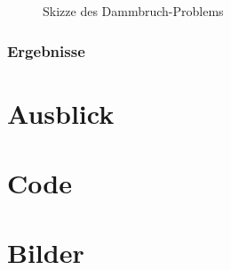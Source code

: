 \def\svgwidth{0.6\textwidth}
\begin{figure}[ht]
\centering
  \caption{Skizze des Dammbruch-Problems}
\end{figure}

\subsection{Ergebnisse}



\chapter{Ausblick}

\appendix

\chapter{Code}
\chapter{Bilder}

\clearpage
{}





